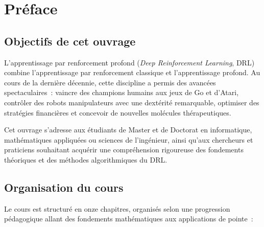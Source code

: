 \chapter*{Pr\'eface}

\section*{Objectifs de cet ouvrage}

L'apprentissage par renforcement profond (\emph{Deep Reinforcement Learning}, DRL)
combine l'apprentissage par renforcement classique et l'apprentissage profond.
Au cours de la derni\`ere d\'ecennie, cette discipline a permis des avanc\'ees
spectaculaires~: vaincre des champions humains aux jeux de Go et d'Atari,
contr\^oler des robots manipulateurs avec une dext\'erit\'e remarquable, optimiser
des strat\'egies financi\`eres et concevoir de nouvelles mol\'ecules th\'erapeutiques.

Cet ouvrage s'adresse aux \'etudiants de Master et de Doctorat en informatique,
math\'ematiques appliqu\'ees ou sciences de l'ing\'enieur, ainsi qu'aux chercheurs et
praticiens souhaitant acqu\'erir une compr\'ehension rigoureuse des fondements
th\'eoriques et des m\'ethodes algorithmiques du DRL.

\section*{Organisation du cours}

Le cours est structur\'e en onze chapitres, organis\'es selon une progression p\'edagogique
allant des fondements math\'ematiques aux applications de pointe~:

